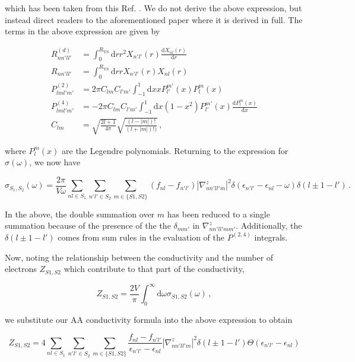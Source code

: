 \documentclass[9pt]{article}
\newcommand{\onlinecite}[1]{\hspace{-1 ex} \nocite{#1}\citenum{#1}}
\begin{document}
which has been taken from this Ref. \onlinecite{Trickey_Kubo_Greenwood}.
We do not derive the above expression, but instead direct readers to the
aforementioned paper where it is derived in full. The terms in the above
expression are given by

\begin{align}
R^{(d)}_{nn'll'} &= \int_0^{R_\textrm{VS}} \textrm{d}r r^2 X_{n'l'}(r) \frac{\textrm{d}X_{nl}(r)}{\textrm{d}r}\\
 R_{nn'll'} &= \int_0^{R_\textrm{VS}} \textrm{d}r r X_{n'l'}(r) X_{nl}(r) \\
 P^{(2)}_{lml'm'} &= 2\pi C_{lm}C_{l'm'} \int_{-1}^{1} \textrm{d}x x P_{l'}^{m'} (x) P_{l}^{m}(x) \\
 P^{(4)}_{lml'm'} &= -2\pi C_{lm}C_{l'm'} \int_{-1}^{1} \textrm{d}x (1-x^2) P_{l'}^{m'} (x) \frac{\textrm{d}P_l^m(x)}{\textrm{d}x}\\
 C_{lm} &= \sqrt{\frac{2l+1}{4\pi}}\sqrt{\frac{(l-|m|)!}{(l+|m|)!)}}\,,
\end{align}

where \(P_l^m(x)\) are the Legendre polynomials. Returning to the
expression for \(\sigma(\omega)\), we now have

\begin{equation}
\sigma_{S_1,S_2}(\omega) = \frac{2\pi}{V\omega} \sum_{nl\in S_1} \sum_{n'l'\in S_2} \sum_{m\in \{S1,S2\}} (f_{nl} - f_{n'l'}) |\nabla_{nn'll'm}^z|^2 \delta (\epsilon_{n'l'} - \epsilon_{nl} - \omega) \delta(l\pm 1 - l')\,.
\end{equation}

In the above, the double summation over \(m\) has been reduced to a
single summation because of the presence of the the \(\delta_{mm'}\) in
\(\nabla_{nn'll'mm'}^z\). Additionally, the \(\delta(l\pm 1 - l')\)
comes from sum rules in the evaluation of the \(P^{(2,4)}\) integrals.

Now, noting the relationship between the conductivity and the number of
electrons \(Z_{S1,S2}\) which contribute to that part of the
conductivity,

\begin{equation}
Z_{S1,S2} = \frac{2V}{\pi} \int_0^\infty \textrm{d}\omega \sigma_{S1,S2}(\omega)\,, 
\end{equation}

we substitute our AA conductivity formula into the above expression to
obtain

\begin{equation}
Z_{S1,S2} = 4 \sum_{nl\in S_1} \sum_{n'l'\in S_2} \sum_{m\in \{S1,S2\}} \frac{f_{nl} - f_{n'l'}}{\epsilon_{n'l'}-\epsilon_{nl}}|\nabla_{nn'll'm}^z|^2 \delta(l\pm 1 - l') \Theta (\epsilon_{n'l'}-\epsilon_{nl})
\end{equation}
\end{document}
